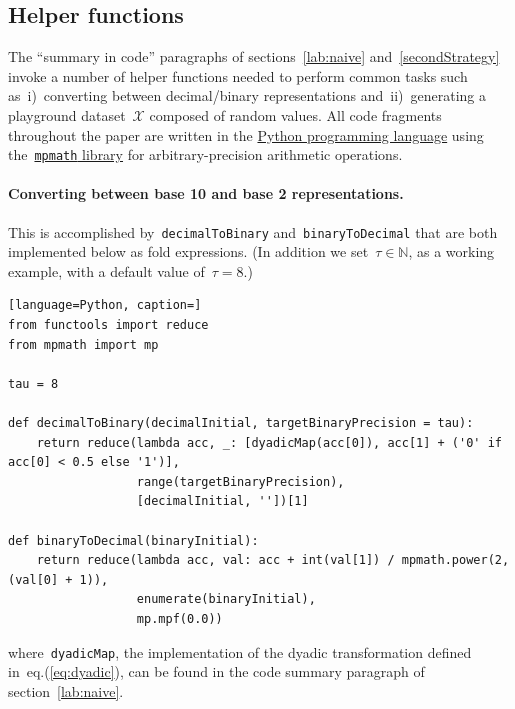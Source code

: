 \documentclass{article}
\begin{document}
\begin{appendices}

\section{Helper functions}
\label{code::appendix}

The ``summary in code'' paragraphs of sections~\ref{lab:naive} and~\ref{secondStrategy} invoke a number of helper functions needed to perform common tasks such as~i)~converting between decimal/binary representations and~ii)~generating a playground dataset~$\mathcal{X}$ composed of random values. All code fragments throughout the paper are written in the \href{https://www.python.org}{Python programming language} using the~\href{http://mpmath.org}{\texttt{mpmath} library} for arbitrary-precision arithmetic operations.

\paragraph{Converting between base 10 and base 2 representations.} This is accomplished by~\texttt{decimalToBinary} and~\texttt{binaryToDecimal} that are both implemented below as fold expressions.  (In addition we set~$\tau \in \mathbb{N}$, as a working example, with a default value of~$\tau=8$.)

\vspace{0.3cm}

\begin{lstlisting}[language=Python, caption=]
from functools import reduce
from mpmath import mp

tau = 8

def decimalToBinary(decimalInitial, targetBinaryPrecision = tau):
    return reduce(lambda acc, _: [dyadicMap(acc[0]), acc[1] + ('0' if acc[0] < 0.5 else '1')], 
                  range(targetBinaryPrecision), 
                  [decimalInitial, ''])[1]

def binaryToDecimal(binaryInitial):
    return reduce(lambda acc, val: acc + int(val[1]) / mpmath.power(2, (val[0] + 1)), 
                  enumerate(binaryInitial), 
                  mp.mpf(0.0))

\end{lstlisting}

\vspace{0.3cm}

\noindent where~\texttt{dyadicMap}, the implementation of the dyadic transformation defined in~eq.(\ref{eq:dyadic}), can be found in the code summary paragraph of section~\ref{lab:naive}. \\


\end{appendices}
\end{document}
